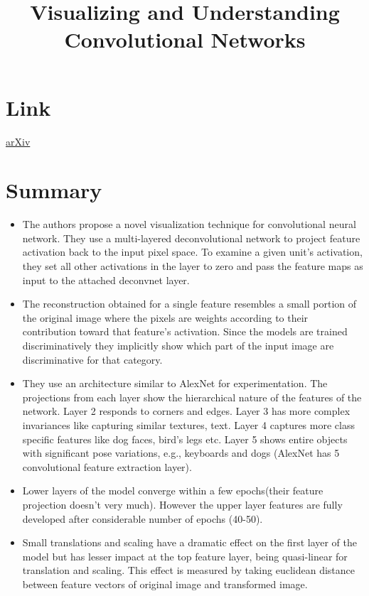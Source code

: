 \documentclass{article}
\title{Visualizing and Understanding Convolutional Networks}
\author{}
\date{}
\begin{document}
\maketitle

\section*{Link}
\href{https://arxiv.org/abs/1311.2901}{arXiv} 

\section*{Summary}
\begin{itemize}
    \item The authors propose a novel visualization technique for convolutional neural network. They use a multi-layered deconvolutional network to project feature activation back to the input pixel space. To examine a given unit's activation, they set all other activations in the layer to zero and pass the feature maps as input to the attached deconvnet layer.   
    \item The reconstruction obtained for a single feature resembles a small portion of the original image where the pixels are weights according to their contribution toward that feature's activation. Since the models are trained discriminatively they implicitly show which part of the input image are discriminative for that category.
    \item They use an architecture similar to AlexNet for experimentation. The projections from each layer show the hierarchical nature of the features of the network. Layer 2 responds to corners and edges. Layer 3 has more complex invariances like capturing similar textures, text. Layer 4 captures more class specific features like dog faces, bird's legs etc. Layer 5 shows entire objects with significant pose variations, e.g., keyboards and dogs (AlexNet has 5 convolutional feature extraction layer). 
    \item Lower layers of the model converge within a few epochs(their feature projection doesn't very much). However the upper layer features are fully developed after considerable number of epochs (40-50).
    \item Small translations and scaling have a dramatic effect on the first layer of the model but has lesser impact at the top feature layer, being quasi-linear for translation and scaling. This effect is measured by taking euclidean distance between feature vectors of original image and transformed image.

\end{itemize}
\end{document}
